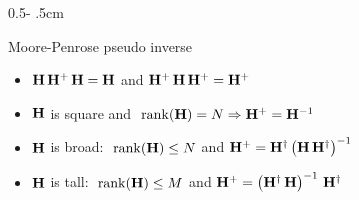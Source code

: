 \documentclass[a4paper]{cookbook}
\begin{document}
\begin{frame}
\begin{columns}[onlytextwidth]
\begin{column}{0.5\textwidth - .5cm}
\begin{block}{Moore-Penrose pseudo inverse}
   \begin{itemize}
       \item        $\mathbf{H}\,\mathbf{H}^+\,\mathbf{H} = \mathbf{H} $ and   $ \mathbf{H}^+\,\mathbf{H}\,\mathbf{H}^+ = \mathbf{H}^+ $
         \item   $\mathbf{H}$ is square and   $\ \rank(\M{H}) = N \Rightarrow \M{H}^+ = \M{H}^{-1}$
        \item     $\mathbf{H}$ is broad: $\ \rank(\M{H}) \leq N$ and $ \mathbf{H}^+ = \mathbf{H}^{\dagger} \left(\mathbf{H}\,\mathbf{H}^{\dagger}\right)^{-1}$
           \item $\mathbf{H}$ is  tall: $\ \rank(\M{H}) \leq M $ and $\mathbf{H}^+ = \left(\mathbf{H}^{\dagger}\,\mathbf{H}\right)^{-1}\,\mathbf{H}^{\dagger} $ 
   \end{itemize}
    \end{block}

\end{column}


\end{columns}

\end{frame}
\end{document}
